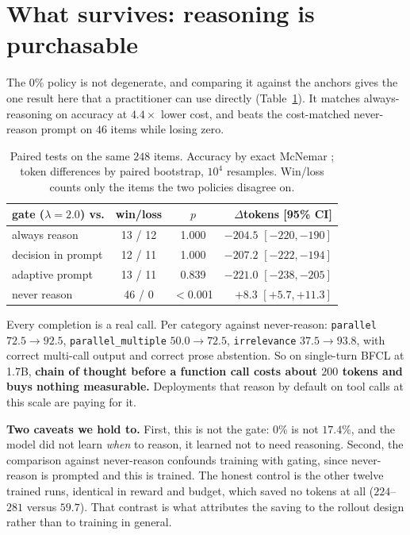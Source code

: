 \documentclass[10pt,twocolumn]{article}
\newcommand{\lam}{\lambda}
\begin{document}
\section{What survives: reasoning is purchasable}
\label{sec:purchasable}

The $0\%$ policy is not degenerate, and comparing it against the anchors gives
the one result here that a practitioner can use directly
(Table~\ref{tab:sig}). It matches always-reasoning on accuracy at $4.4\times$
lower cost, and beats the cost-matched never-reason prompt on $46$ items while
losing zero.

\begin{table}[t]
\centering\small
\setlength{\tabcolsep}{4pt}
\begin{tabular}{lccr}
\toprule
gate ($\lam{=}2.0$) vs. & win/loss & $p$ & $\Delta$tokens [95\% CI]\\
\midrule
always reason      & 13 / 12 & 1.000 & $-204.5$ $[-220,-190]$\\
decision in prompt & 12 / 11 & 1.000 & $-207.2$ $[-222,-194]$\\
adaptive prompt    & 13 / 11 & 0.839 & $-221.0$ $[-238,-205]$\\
never reason       & 46 / \phantom{0}0 & $<$0.001 & $+8.3$ $[+5.7,+11.3]$\\
\bottomrule
\end{tabular}
\caption{Paired tests on the same $248$ items. Accuracy by exact McNemar
\cite{mcnemar1947}; token differences by paired bootstrap, $10^4$ resamples.
Win/loss counts only the items the two policies disagree on.}
\label{tab:sig}
\end{table}

Every completion is a real call. Per category against never-reason:
\texttt{parallel} $72.5\rightarrow92.5$, \texttt{parallel\_multiple}
$50.0\rightarrow72.5$, \texttt{irrelevance} $37.5\rightarrow93.8$, with correct
multi-call output and correct prose abstention. So on single-turn BFCL at 1.7B,
\textbf{chain of thought before a function call costs about $200$ tokens and buys
nothing measurable.} Deployments that reason by default on tool calls at this
scale are paying for it.

\textbf{Two caveats we hold to.} First, this is not the gate: $0\%$ is not
$17.4\%$, and the model did not learn \emph{when} to reason, it learned not to
need reasoning. Second, the comparison against never-reason confounds training
with gating, since never-reason is prompted and this is trained. The honest
control is the other twelve trained runs, identical in reward and budget, which
saved no tokens at all ($224$--$281$ versus $59.7$). That contrast is what
attributes the saving to the rollout design rather than to training in general.
\end{document}
